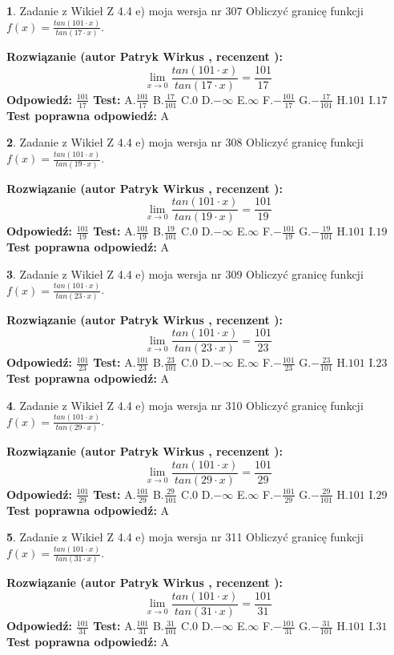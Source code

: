 \documentclass[12pt, a4paper]{article}
\theoremstyle{definition} %
\newtheorem{zad}{}
\newcommand{\zadStart}[1]{\begin{zad}#1\newline}
\newcommand{\zadStop}{\end{zad}}
\newcommand{\rozwStart}[2]{\noindent \textbf{Rozwiązanie (autor #1 , recenzent #2): }\newline}
\newcommand{\rozwStop}{\newline}
\newcommand{\odpStart}{\noindent \textbf{Odpowiedź:}\newline}
\newcommand{\odpStop}{\newline}
\newcommand{\testStart}{\noindent \textbf{Test:}\newline}
\newcommand{\testStop}{\newline}
\newcommand{\kluczStart}{\noindent \textbf{Test poprawna odpowiedź:}\newline}
\newcommand{\kluczStop}{\newline}
\begin{document}
\zadStart{Zadanie z Wikieł Z 4.4 e) moja wersja nr 307}
Obliczyć granicę funkcji $f(x)=\frac{tan(101\cdot x)}{tan(17\cdot x)}$.
\zadStop
\rozwStart{Patryk Wirkus}{}
$$\lim\limits_{x\to 0}\frac{tan(101\cdot x)}{tan(17\cdot x)}=
\frac{101}{17}$$
\rozwStop
\odpStart
$\frac{101}{17}$
\odpStop
\testStart
A.$\frac{101}{17}$
B.$\frac{17}{101}$
C.$0$
D.$-\infty$
E.$\infty$
F.$-\frac{101}{17}$
G.$-\frac{17}{101}$
H.$101$
I.$17$
\testStop
\kluczStart
A
\kluczStop



\zadStart{Zadanie z Wikieł Z 4.4 e) moja wersja nr 308}
Obliczyć granicę funkcji $f(x)=\frac{tan(101\cdot x)}{tan(19\cdot x)}$.
\zadStop
\rozwStart{Patryk Wirkus}{}
$$\lim\limits_{x\to 0}\frac{tan(101\cdot x)}{tan(19\cdot x)}=
\frac{101}{19}$$
\rozwStop
\odpStart
$\frac{101}{19}$
\odpStop
\testStart
A.$\frac{101}{19}$
B.$\frac{19}{101}$
C.$0$
D.$-\infty$
E.$\infty$
F.$-\frac{101}{19}$
G.$-\frac{19}{101}$
H.$101$
I.$19$
\testStop
\kluczStart
A
\kluczStop



\zadStart{Zadanie z Wikieł Z 4.4 e) moja wersja nr 309}
Obliczyć granicę funkcji $f(x)=\frac{tan(101\cdot x)}{tan(23\cdot x)}$.
\zadStop
\rozwStart{Patryk Wirkus}{}
$$\lim\limits_{x\to 0}\frac{tan(101\cdot x)}{tan(23\cdot x)}=
\frac{101}{23}$$
\rozwStop
\odpStart
$\frac{101}{23}$
\odpStop
\testStart
A.$\frac{101}{23}$
B.$\frac{23}{101}$
C.$0$
D.$-\infty$
E.$\infty$
F.$-\frac{101}{23}$
G.$-\frac{23}{101}$
H.$101$
I.$23$
\testStop
\kluczStart
A
\kluczStop



\zadStart{Zadanie z Wikieł Z 4.4 e) moja wersja nr 310}
Obliczyć granicę funkcji $f(x)=\frac{tan(101\cdot x)}{tan(29\cdot x)}$.
\zadStop
\rozwStart{Patryk Wirkus}{}
$$\lim\limits_{x\to 0}\frac{tan(101\cdot x)}{tan(29\cdot x)}=
\frac{101}{29}$$
\rozwStop
\odpStart
$\frac{101}{29}$
\odpStop
\testStart
A.$\frac{101}{29}$
B.$\frac{29}{101}$
C.$0$
D.$-\infty$
E.$\infty$
F.$-\frac{101}{29}$
G.$-\frac{29}{101}$
H.$101$
I.$29$
\testStop
\kluczStart
A
\kluczStop



\zadStart{Zadanie z Wikieł Z 4.4 e) moja wersja nr 311}
Obliczyć granicę funkcji $f(x)=\frac{tan(101\cdot x)}{tan(31\cdot x)}$.
\zadStop
\rozwStart{Patryk Wirkus}{}
$$\lim\limits_{x\to 0}\frac{tan(101\cdot x)}{tan(31\cdot x)}=
\frac{101}{31}$$
\rozwStop
\odpStart
$\frac{101}{31}$
\odpStop
\testStart
A.$\frac{101}{31}$
B.$\frac{31}{101}$
C.$0$
D.$-\infty$
E.$\infty$
F.$-\frac{101}{31}$
G.$-\frac{31}{101}$
H.$101$
I.$31$
\testStop
\kluczStart
A
\kluczStop
\end{document}
